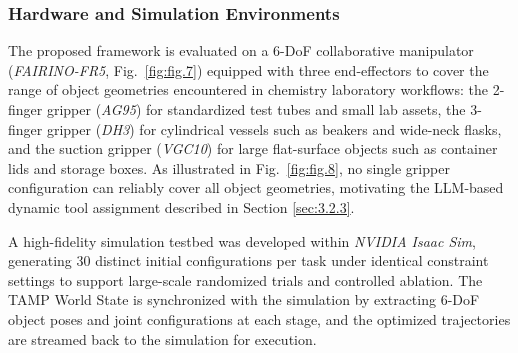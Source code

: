 \documentclass{ieeeaccess}
\begin{document}
\subsubsection{Hardware and Simulation Environments}\label{sec:4.1.1}
The proposed framework is evaluated on a 6-DoF collaborative manipulator (\textit{FAIRINO-FR5}, Fig.~\ref{fig:fig.7}) equipped with three end-effectors to cover the range of object geometries encountered in chemistry laboratory workflows: the 2-finger gripper (\textit{AG95}) for standardized test tubes and small lab assets, the 3-finger gripper (\textit{DH3}) for cylindrical vessels such as beakers and wide-neck flasks, and the suction gripper (\textit{VGC10}) for large flat-surface objects such as container lids and storage boxes. As illustrated in Fig.~\ref{fig:fig.8}, no single gripper configuration can reliably cover all object geometries, motivating the LLM-based dynamic tool assignment described in Section \ref{sec:3.2.3}.

A high-fidelity simulation testbed was developed within \textit{NVIDIA Isaac Sim}, generating 30 distinct initial configurations per task under identical constraint settings to support large-scale randomized trials and controlled ablation. The TAMP World State is synchronized with the simulation by extracting 6-DoF object poses and joint configurations at each stage, and the optimized trajectories are streamed back to the simulation for execution.
\end{document}
